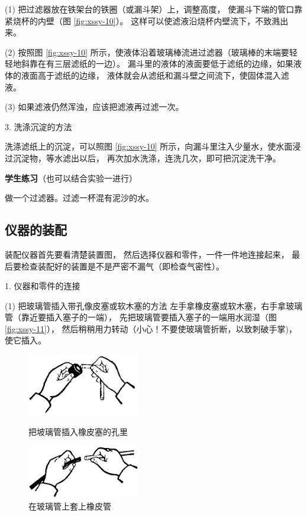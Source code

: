 (1) 把过滤器放在铁架台的铁圈（或漏斗架）上，调整高度，
使漏斗下端的管口靠紧烧杯的内壁（图 \ref{fig:xssy-10}）。
这样可以使滤液沿烧杯内壁流下，不致溅出来。


(2) 按照图 \ref{fig:xssy-10} 所示，使液体沿着玻璃棒流进过滤器（玻璃棒的末端要轻轻地斜靠在有三层滤纸的一边）。
漏斗里的液体的液面要低于滤纸的边缘，如果液体的液面高于滤纸的边缘，
液体就会从滤纸和漏斗壁之间流下，使固体混入滤液。

(3) 如果滤液仍然浑浊，应该把滤液再过滤一次。

3. 洗涤沉淀的方法

洗涤滤纸上的沉淀，可以照图 \ref{fig:xssy-10} 所示，向漏斗里注入少量水，使水面浸过沉淀物，等水滤出以后，
再次加水洗涤，连洗几次，即可把沉淀洗干净。

\textbf{学生练习}（也可以结合实验一进行）

做一个过滤器。过滤一杯混有泥沙的水。



\subsection{仪器的装配\footnotemark}

装配仪器首先要看清楚装置图， 然后选择仪器和零件，一件一件地连接起来，
最后要检查装配好的装置是不是严密不漏气（即检查气密性）。

1. 仪器和零件的连接

(1) 把玻璃管插入带孔像皮塞或软木塞的方法 \quad
左手拿橡皮塞或软木塞，右手拿玻璃管（靠近要插入塞子的一端），
先把玻璃管要插入塞子的一端用水润湿（图 \ref{fig:xssy-11}），
然后稍稍用力转动（小心！不要使玻璃管折断，以致刺破手掌)，使它插入。


\begin{figure}[htbp]
    \centering
    \begin{minipage}[b]{7cm}
        \centering
        \includegraphics[width=5cm]{../pic/czhx1-xssy-11}
        \caption{把坡璃管插入橡皮塞的孔里}\label{fig:xssy-11}
    \end{minipage}
    \qquad
    \begin{minipage}[b]{7cm}
        \centering
        \includegraphics[width=5cm]{../pic/czhx1-xssy-12}
        \caption{在玻璃管上套上橡皮管}\label{fig:xssy-12}
    \end{minipage}
\end{figure}

